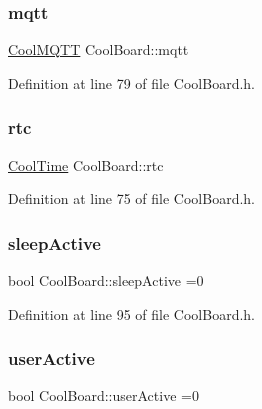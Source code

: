 \subsubsection{\texorpdfstring{mqtt}{mqtt}}
{\footnotesize\ttfamily \hyperlink{class_cool_m_q_t_t}{Cool\+M\+Q\+TT} Cool\+Board\+::mqtt\hspace{0.3cm}{\ttfamily [private]}}



Definition at line 79 of file Cool\+Board.\+h.

\mbox{\label{class_cool_board_a50d2a6716879d64a85f3c6b44ad63275}} 
\subsubsection{\texorpdfstring{rtc}{rtc}}
{\footnotesize\ttfamily \hyperlink{class_cool_time}{Cool\+Time} Cool\+Board\+::rtc\hspace{0.3cm}{\ttfamily [private]}}



Definition at line 75 of file Cool\+Board.\+h.

\mbox{\label{class_cool_board_a0a51b2287139f66c738101fb53139230}} 
\subsubsection{\texorpdfstring{sleep\+Active}{sleepActive}}
{\footnotesize\ttfamily bool Cool\+Board\+::sleep\+Active =0\hspace{0.3cm}{\ttfamily [private]}}



Definition at line 95 of file Cool\+Board.\+h.

\mbox{\label{class_cool_board_a6395459131d6889a3005f79c7a35e964}} 
\subsubsection{\texorpdfstring{user\+Active}{userActive}}
{\footnotesize\ttfamily bool Cool\+Board\+::user\+Active =0\hspace{0.3cm}{\ttfamily [private]}}



